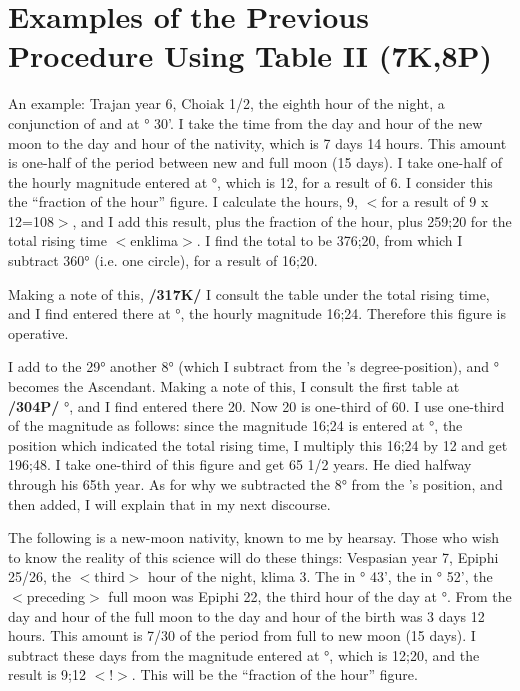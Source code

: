 \section{Examples of the Previous Procedure Using Table II (7K,8P)}

An example: Trajan year 6, Choiak 1/2, the eighth hour of the night, a conjunction of \Sun\xspace and \Moon\xspace at \Sagittarius\xspace 8° 30'. I take the time from the day and hour of the new moon to the day and hour of the nativity, which is 7 days 14 hours. This amount is one-half of the period between new and full moon (15 days). I take one-half of the hourly magnitude entered at \Sagittarius\xspace 8°, which is 12, for a result of 6. I consider this the “fraction of the hour” figure. I calculate the hours, 9, $<$for a result of 9 x 12=108$>$, and I
add this result, plus the fraction of the hour, plus 259;20 for the total rising time $<$enklima$>$. I find the total to be 376;20, from which I subtract 360° (i.e. one circle), for a result of 16;20. 

Making a note of this, \textbf{/317K/} I consult the table under the total rising time, and I find entered there at \Aries\xspace 29°, the hourly magnitude 16;24. Therefore this figure is operative. 

I add to the 29° another 8° (which I subtract from the \Sun’s degree-position), and \Taurus\xspace 7° becomes the Ascendant. Making a note of this, I consult the first table at \textbf{/304P/} \Taurus\xspace 7°, and I find entered there 20. Now 20 is one-third of 60. I use one-third of the magnitude as follows: since the magnitude 16;24 is entered at \Aries\xspace 29°, the position which indicated the total rising time, I multiply this 16;24 by 12 and get 196;48. I take one-third of this figure and get 65 1/2 years. He died halfway through his 65th year. As for why we subtracted the 8° from the \Sun’s position, and then added, I will explain that in my next discourse.

The following is a new-moon nativity, known to me by hearsay. Those who wish to know the reality of this science will do these things: Vespasian year 7, Epiphi 25/26, the $<$third$>$ hour of the night, klima 3. The \Sun\xspace in \Cancer\xspace 27° 43', the \Moon\xspace in \Pisces\xspace 12° 52', the $<$preceding$>$ full moon was Epiphi 22, the third hour of the day at \Capricorn\xspace 24°. From the day and hour of the full moon to the day and hour of the birth was 3 days 12 hours. This amount is 7/30 of the period from full to new moon (15 days). I subtract these days from the magnitude entered at \Capricorn\xspace 20°, which is 12;20, and the result is 9;12 $<$!$>$. This will be the “fraction of the hour” figure. 

